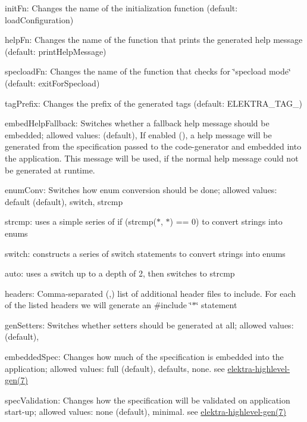 \begin{DoxyItemize}
\item {\ttfamily init\+Fn}\+: Changes the name of the initialization function (default\+: {\ttfamily load\+Configuration})
\item {\ttfamily help\+Fn}\+: Changes the name of the function that prints the generated help message (default\+: {\ttfamily print\+Help\+Message})
\item {\ttfamily specload\+Fn}\+: Changes the name of the function that checks for \char`\"{}specload mode\char`\"{} (default\+: {\ttfamily exit\+For\+Specload})
\item {\ttfamily tag\+Prefix}\+: Changes the prefix of the generated tags (default\+: {\ttfamily E\+L\+E\+K\+T\+R\+A\+\_\+\+T\+A\+G\+\_\+})
\item {\ttfamily embed\+Help\+Fallback}\+: Switches whether a fallback help message should be embedded; allowed values\+: {} (default), {} If enabled ({}), a help message will be generated from the specification passed to the code-\/generator and embedded into the application. This message will be used, if the normal help message could not be generated at runtime.
\item {\ttfamily enum\+Conv}\+: Switches how enum conversion should be done; allowed values\+: {\ttfamily default} (default), {\ttfamily switch}, {\ttfamily strcmp}
\begin{DoxyItemize}
\item {\ttfamily strcmp}\+: uses a simple series of {\ttfamily if (strcmp($\ast$, $\ast$) == 0)} to convert strings into enums
\item {\ttfamily switch}\+: constructs a series of {\ttfamily switch} statements to convert strings into enums
\item {\ttfamily auto}\+: uses a {\ttfamily switch} up to a depth of 2, then switches to {\ttfamily strcmp}
\end{DoxyItemize}
\item {\ttfamily headers}\+: Comma-\/separated ({\ttfamily ,}) list of additional header files to include. For each of the listed headers we will generate an {\ttfamily \#include \char`\"{}$\ast$\char`\"{}} statement
\item {\ttfamily gen\+Setters}\+: Switches whether setters should be generated at all; allowed values\+: {} (default), {}
\item {\ttfamily embedded\+Spec}\+: Changes how much of the specification is embedded into the application; allowed values\+: {\ttfamily full} (default), {\ttfamily defaults}, {\ttfamily none}. see \hyperlink{doc_help_elektra-highlevel-gen_md}{elektra-\/highlevel-\/gen(7)}
\item {\ttfamily spec\+Validation}\+: Changes how the specification will be validated on application start-\/up; allowed values\+: {\ttfamily none} (default), {\ttfamily minimal}. see \hyperlink{doc_help_elektra-highlevel-gen_md}{elektra-\/highlevel-\/gen(7)}
\end{DoxyItemize}

